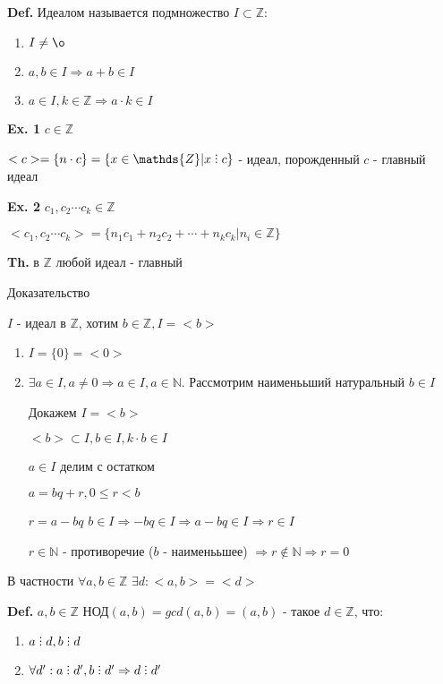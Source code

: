 \documentclass[14pt, letter paper]{article}
\DeclareRobustCommand{\divby}{%
  \mathrel{\text{\vbox{\baselineskip.65ex\lineskiplimit0pt\hbox{.}\hbox{.}\hbox{.}}}}%
}
\begin{document}
\textbf{Def.} Идеалом называется подмножество $I \subset \mathds{Z}$:
\begin{enumerate}
    \item $I \neq \o$
    \item $a, b \in I \Rightarrow a + b \in I$
    \item $a \in I, k \in \mathds{Z} \Rightarrow a \cdot k \in I$
\end{enumerate}

\textbf{Ex. 1} $c \in \mathds{Z}$

$<c> = \{n \cdot c\} = \{ x \in \mathds{Z} | x \divby c\}$ - идеал, порожденный $c$ - главный идеал

\textbf{Ex. 2} $c_1, c_2 \cdots c_k \in \mathds{Z}$

$<c_1, c_2 \cdots c_k> = \{n_1 c_1 + n_2 c_2 + \cdots + n_k c_k | n_i \in \mathds{Z} \}$

{\textbf{Th.} в $\mathds{Z}$ любой идеал - главный}

\begin{center}
    Доказательство
\end{center}

$I$ - идеал в $\mathds{Z}$, хотим $b \in \mathds{Z}, I = <b>$

\begin{enumerate}
    \item $I = \{0\} = <0>$
    \item $\exists a \in I, a \neq 0 \Rightarrow a \in I, a \in \mathds{N}$. Рассмотрим наименььший натуральный $b \in I$

    Докажем $I = <b>$

    $<b> \subset I, b \in I, k \cdot b \in I$

    $a \in I$ делим с остатком

    $a = bq + r, 0 \leq r < b$

    $r = a - bq$ $b \in I \Rightarrow -bq \in I \Rightarrow a - bq \in I \Rightarrow r \in I$

    $r \in \mathds{N}$ - противоречие ($b$ - наименььшее) $\Rightarrow r \notin \mathds{N} \Rightarrow r = 0$
\end{enumerate}

В частности $\forall a, b \in \mathds{Z}$ $\exists d: <a, b> = <d>$

\textbf{Def.} $a, b \in \mathds{Z}$ НОД$(a, b) = gcd(a, b) = (a, b)$ - такое $d \in \mathds{Z}$, что:
\begin{enumerate}
    \item $a \divby d, b \divby d$
    \item $\forall d': a \divby d', b \divby d' \Rightarrow d \divby d'$
\end{enumerate}
\end{document}
